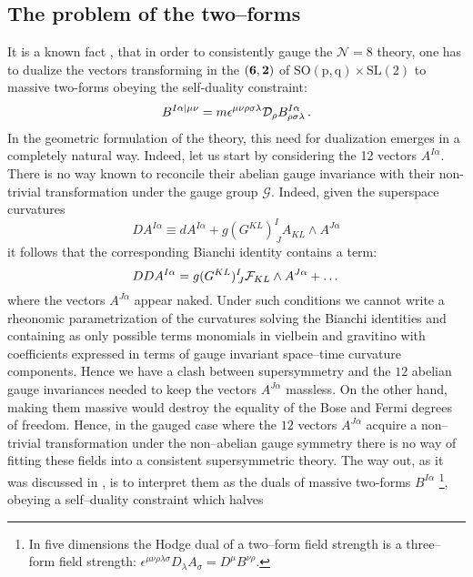 \documentclass[a4paper,12pt]{article}
\begin{document}
\subsection{The problem of the two--forms}
It is a known fact \cite{PPV}, \cite{gunwar} that in order to
consistently gauge the $\mathcal{N}=8$ theory, one has to dualize
the vectors transforming in the $(\bf{6},\bf{2})$ of
$\mathrm{SO(p,q)}\times \mathrm{SL}(2)$ to massive two-forms
obeying the self-duality constraint:
\begin{equation}
B^{I\alpha |\mu\nu} = m
\epsilon^{\mu\nu\rho\sigma\lambda}{\cal{D}}_\rho
B^{I\alpha}_{\rho\sigma\lambda}\,. \label{self}
\end{equation}
In the geometric formulation of the theory, this need for
dualization emerges in a completely natural way. Indeed, let us
start by considering the 12 vectors $A^{I\alpha}$. There is no way
known to reconcile their abelian gauge invariance with their
non-trivial transformation under the gauge group $\mathcal{G}$.
Indeed, given the superspace curvatures
\begin{equation}
 DA^{I\alpha} \equiv dA^{I\alpha}+g(G^{KL})^I_{\,J}A_{KL}\wedge A^{J\alpha}
\end{equation}
it follows that the corresponding Bianchi identity contains a
term:
\begin{equation}
DDA^{I\alpha} = g(G^{KL})^I_{\,J}{\cal F}_{KL}\wedge
A^{J\alpha}+\dots
\end{equation}
where the vectors $A^{J\alpha}$ appear naked. Under such
conditions we cannot write a rheonomic parametrization of the
curvatures solving the Bianchi identities and containing as only
possible terms monomials in vielbein and gravitino with
coefficients expressed in terms of gauge invariant space--time
curvature components. Hence we have a clash between supersymmetry
and the $12$ abelian gauge invariances needed to keep the vectors
$A^{J\alpha}$ massless. On the other hand, making them massive
would destroy the equality of the Bose and Fermi degrees of
freedom. Hence, in the gauged case where the $12$ vectors
$A^{J\alpha}$ acquire a non--trivial transformation under the
non--abelian gauge symmetry there is no way of fitting these
fields into a  consistent supersymmetric theory. The way out, as
it was discussed in \cite{gunwar}, is to interpret them as the
duals of massive two-forms $B^{I\alpha}$ \footnote{In five
dimensions the Hodge dual of a two--form field strength is a
three--form field strength:
$\epsilon^{\mu\nu\rho\lambda\sigma}D_\lambda A_{\sigma}= D^\mu
B^{\nu\rho}$.}, obeying a self--duality constraint which halves
\end{document}
